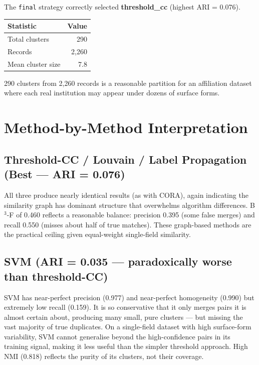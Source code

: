 \documentclass[11pt, a4paper]{article}
\begin{document}
The \texttt{final} strategy correctly selected \textbf{threshold\_cc} (highest ARI = 0.076).

\begin{table}[h!]
\centering
\begin{tabular}{lr}
\toprule
\textbf{Statistic} & \textbf{Value} \\
\midrule
Total clusters   & 290 \\
Records          & 2,260 \\
Mean cluster size & 7.8 \\
\bottomrule
\end{tabular}
\end{table}

290 clusters from 2,260 records is a reasonable partition for an affiliation dataset where each
real institution may appear under dozens of surface forms.

\section{Method-by-Method Interpretation}

\subsection*{Threshold-CC / Louvain / Label Propagation (Best --- ARI = 0.076)}
All three produce nearly identical results (as with CORA), again indicating the similarity graph
has dominant structure that overwhelms algorithm differences. B$^3$-F of 0.460 reflects a
reasonable balance: precision 0.395 (some false merges) and recall 0.550 (misses about half of
true matches). These graph-based methods are the practical ceiling given equal-weight single-field
similarity.

\subsection*{SVM (ARI = 0.035 --- paradoxically worse than threshold-CC)}
SVM has near-perfect precision (0.977) and near-perfect homogeneity (0.990) but extremely low
recall (0.159). It is so conservative that it only merges pairs it is almost certain about,
producing many small, pure clusters --- but missing the vast majority of true duplicates. On a
single-field dataset with high surface-form variability, SVM cannot generalise beyond the
high-confidence pairs in its training signal, making it less useful than the simpler threshold
approach. High NMI (0.818) reflects the purity of its clusters, not their coverage.
\end{document}
